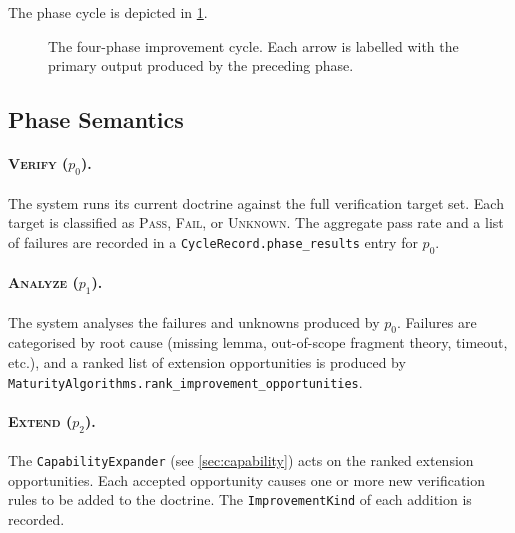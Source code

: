 \documentclass[11pt]{article}
\newcommand{\Verify}{\textsc{Verify}}
\newcommand{\Analyze}{\textsc{Analyze}}
\newcommand{\Extend}{\textsc{Extend}}
\newcommand{\ReVerify}{\textsc{Re-Verify}}
\begin{document}
The phase cycle is depicted in \cref{fig:cycle}.

\begin{figure}[H]
\centering
{}
\caption{The four-phase improvement cycle.  Each arrow is labelled with the
  primary output produced by the preceding phase.}\label{fig:cycle}
\end{figure}

\subsection{Phase Semantics}

\paragraph{\Verify{} ($p_0$).}  The system runs its current doctrine against
the full verification target set.  Each target is classified as
\textsc{Pass}, \textsc{Fail}, or \textsc{Unknown}.  The aggregate pass rate
and a list of failures are recorded in a \texttt{CycleRecord.phase\_results}
entry for $p_0$.

\paragraph{\Analyze{} ($p_1$).}  The system analyses the failures and
unknowns produced by $p_0$.  Failures are categorised by root cause
(missing lemma, out-of-scope fragment theory, timeout, etc.), and a ranked
list of extension opportunities is produced by
\texttt{MaturityAlgorithms.rank\_improvement\_opportunities}.

\paragraph{\Extend{} ($p_2$).}  The \texttt{CapabilityExpander} (see
\cref{sec:capability}) acts on the ranked extension opportunities.  Each
accepted opportunity causes one or more new verification rules to be added
to the doctrine.  The \texttt{ImprovementKind} of each addition is recorded.
\end{document}
